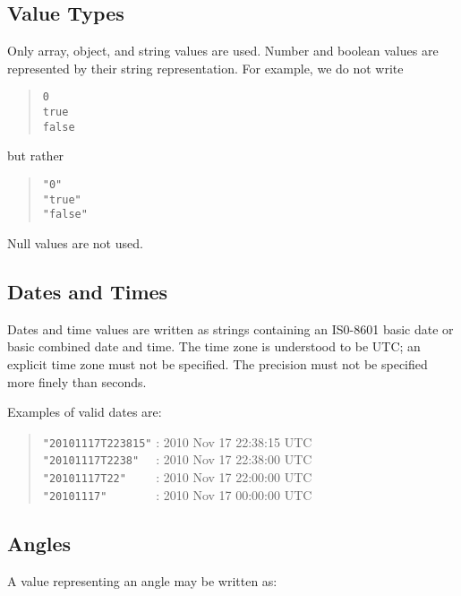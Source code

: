 \subsection{Value Types}

Only array, object, and string values are used. Number and boolean values are represented by their string representation. For example, we do not write
\begin{quote}
\verb|0|\\
\verb|true|\\
\verb|false|\\
\end{quote}
but rather 
\begin{quote}
\verb|"0"|\\
\verb|"true"|\\
\verb|"false"|\\
\end{quote}
Null values are not used.

\subsection{Dates and Times}

Dates and time values are written as strings containing an IS0-8601 basic date or basic combined date and time.
The time zone is understood to be UTC; an explicit time zone must not be specified. The precision must not be specified more finely than seconds.

Examples of valid dates are:
\begin{quote}
\verb|"20101117T223815"| : 2010 Nov 17 22:38:15 UTC\\
\verb|"20101117T2238"  | : 2010 Nov 17 22:38:00 UTC\\
\verb|"20101117T22"    | : 2010 Nov 17 22:00:00 UTC\\
\verb|"20101117"       | : 2010 Nov 17 00:00:00 UTC
\end{quote}

\subsection{Angles}
\label{section:angles}

A value representing an angle may be written as:

